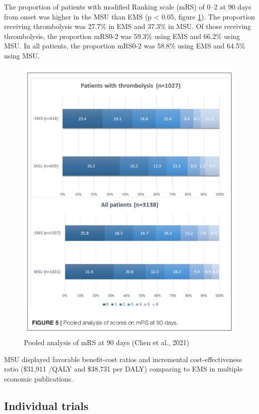 The proportion of patients with modified Ranking scale (mRS) of 0–2 at 90 days from onset was higher in the MSU than EMS (p < 0.05, figure \ref{fig:background_chen_fig_5}). The proportion receiving thrombolysis was 27.7\% in EMS and 37.3\% in MSU. Of those receiving thrombolysis, the proportion mRS0-2 was 59.3\% using EMS and 66.2\% using MSU. In all patients, the proportion mRS0-2 was 58.8\% using EMS and 64.5\% using MSU.

\begin{figure}
    \centering
    \includegraphics[width=0.9\linewidth]{images_background/chen_fig_5}
    \caption{Pooled analysis of mRS at 90 days (Chen et al., 2021)}
    \label{fig:background_chen_fig_5}
\end{figure}

MSU displayed favorable benefit-cost ratios and incremental cost-effectiveness ratio (\$31,911 /QALY and \$38,731 per DALY) comparing to EMS in multiple economic publications.


\subsection{Individual trials}

